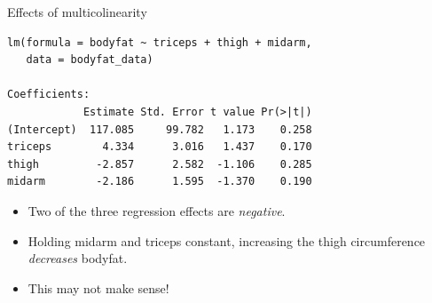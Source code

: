 \documentclass{beamer}
\begin{document}
\begin{frame}[fragile]{Effects of multicolinearity}
\begin{small}
\begin{verbatim}
lm(formula = bodyfat ~ triceps + thigh + midarm, 
   data = bodyfat_data)

Coefficients:
            Estimate Std. Error t value Pr(>|t|)
(Intercept)  117.085     99.782   1.173    0.258
triceps        4.334      3.016   1.437    0.170
thigh         -2.857      2.582  -1.106    0.285
midarm        -2.186      1.595  -1.370    0.190
\end{verbatim}
\end{small}

\begin{itemize}
    \item\pause Two of the three regression effects are {\it negative}.
    \item\pause Holding midarm
and triceps constant, increasing the thigh circumference {\it decreases} bodyfat.
    \item\pause This may not make sense!
\end{itemize}  
\end{frame}
\end{document}
